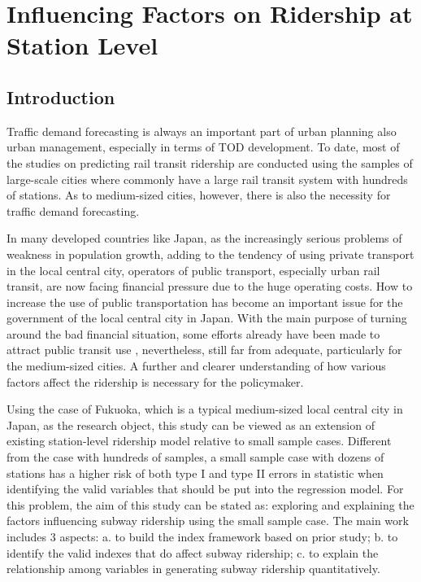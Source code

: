 \chapter{Influencing Factors on Ridership at Station Level}
%
\section{Introduction}

Traffic demand forecasting is always an important part of urban planning also urban management, especially in terms of TOD development. To date, most of the studies on predicting rail transit ridership are conducted using the samples of large-scale cities where commonly have a large rail transit system with hundreds of stations. As to medium-sized cities, however, there is also the necessity for traffic demand forecasting. 

In many developed countries like Japan, as the increasingly serious problems of weakness in population growth, adding to the tendency of using private transport in the local central city, operators of public transport, especially urban rail transit, are now facing financial pressure due to the huge operating costs. How to increase the use of public transportation has become an important issue for the government of the local central city in Japan. With the main purpose of turning around the bad financial situation, some efforts already have been made to attract public transit use \cite{takashi2015study}, nevertheless, still far from adequate, particularly for the medium-sized cities. A further and clearer understanding of how various factors affect the ridership is necessary for the policymaker.


Using the case of Fukuoka, which is a typical medium-sized local central city in Japan, as the research object, this study can be viewed as an extension of existing station-level ridership model relative to small sample cases. Different from the case with hundreds of samples, a small sample case with dozens of stations has a higher risk of both type I and type II errors in statistic when identifying the valid variables that should be put into the regression model. For this problem, the aim of this study can be stated as: exploring and explaining the factors influencing subway ridership using the small sample case. The main work includes 3 aspects: a. to build the index framework based on prior study; b. to identify the valid indexes that do affect subway ridership; c. to explain the relationship among variables in generating subway ridership quantitatively.

